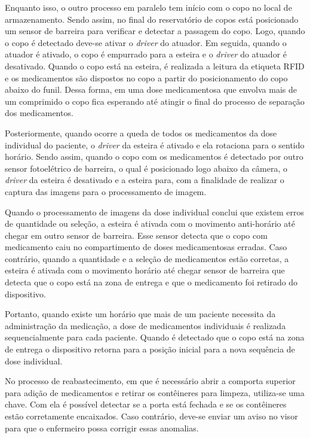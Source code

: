 Enquanto isso, o outro processo em paralelo tem início com o copo no local de armazenamento. Sendo assim, no final do reservatório de copos está posicionado um sensor de barreira para verificar e detectar a passagem do copo. Logo, quando o copo é detectado deve-se ativar o \textit{driver} do atuador. Em seguida, quando o atuador é ativado, o copo é empurrado para a esteira e o \textit{driver} do atuador é desativado. Quando o copo está na esteira, é realizada a leitura da etiqueta RFID e os medicamentos são dispostos no copo a partir do posicionamento do copo abaixo do funil. Dessa forma, em uma dose medicamentosa que envolva mais de um comprimido o copo fica esperando até atingir o final do processo de separação dos medicamentos.

Posteriormente, quando ocorre a queda de todos os medicamentos da dose individual do paciente, o \textit{driver} da esteira é ativado e ela rotaciona para o sentido horário. Sendo assim, quando o copo com os medicamentos é detectado por outro sensor fotoelétrico de barreira, o qual é posicionado logo abaixo da câmera, o \textit{driver} da esteira é desativado e a esteira para, com a finalidade de realizar o captura das imagens para o processamento de imagem. 

Quando o processamento de imagens da dose individual conclui que existem erros de quantidade ou seleção, a esteira é ativada com o movimento anti-horário até chegar em outro sensor de barreira. Esse sensor detecta que o copo com medicamento caiu no compartimento de doses medicamentosas erradas. Caso contrário, quando a quantidade e a seleção de medicamentos estão corretas, a esteira é ativada com o movimento horário até chegar sensor de barreira que detecta que o copo está na zona de entrega e que o medicamento foi retirado do dispositivo. 

Portanto, quando existe um horário que mais de um paciente necessita da administração da medicação, a dose de medicamentos individuais é realizada sequencialmente para cada paciente. Quando é detectado que o copo está na zona de entrega o dispositivo retorna para a posição inicial para a nova sequência de dose individual.

No processo de reabastecimento, em que é necessário abrir a comporta superior para adição de medicamentos e retirar os contêineres para limpeza, utiliza-se uma chave. Com ela é possível detectar se a porta está fechada e se os contêineres estão corretamente encaixados. Caso contrário, deve-se enviar um aviso no visor para que o enfermeiro possa corrigir essas anomalias. 

